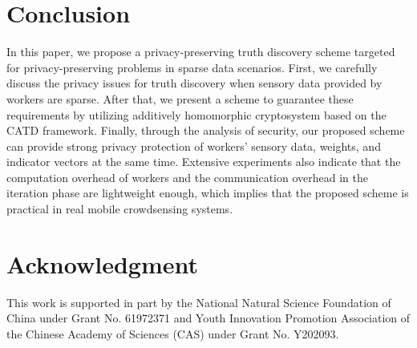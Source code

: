 \documentclass[conference]{IEEEtran}
\begin{document}
\section{Conclusion}\label{sec8}
In this paper, we propose a privacy-preserving truth discovery scheme targeted for privacy-preserving problems in sparse data scenarios.
First, we carefully discuss the privacy issues for truth discovery when sensory data provided by workers are sparse.
After that, we present a scheme to guarantee these requirements by utilizing additively homomorphic cryptosystem based on the CATD framework.
Finally, through the analysis of security, our proposed scheme can provide strong privacy protection of workers' sensory data, weights, and indicator vectors at the same time.
Extensive experiments also indicate that the computation overhead of workers and the communication overhead in the iteration phase are lightweight enough, which implies that the proposed scheme is practical in real mobile crowdsensing systems.

\section*{Acknowledgment}
This work is supported in part by the National Natural Science Foundation of China under Grant No. 61972371 and Youth Innovation Promotion Association of the Chinese Academy of Sciences (CAS) under Grant No. Y202093.




\vspace{12pt}
\end{document}
